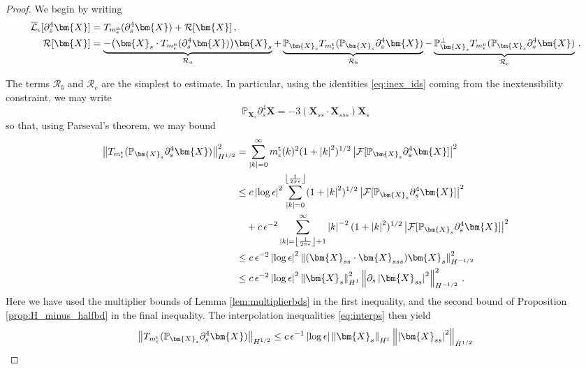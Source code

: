 \documentclass[11pt,reqno]{amsart}
\renewcommand{\P}{\mathbb{P}}
\newcommand{\X}{\bm{X}}
\newcommand{\p}{\partial}
\newcommand{\abs}[1]{\left\lvert #1 \right\rvert}
\newcommand{\norm}[1]{\left\lVert #1 \right\rVert}
\newcommand{\floor}[1]{\left\lfloor #1 \right\rfloor}
\newcommand{\mc}[1]{\mathcal{#1}}
\numberwithin{equation}{section}
\theoremstyle{definition}
\begin{document}
\begin{proof}
We begin by writing
\begin{equation}
\begin{aligned}
  \overline{\mc{L}}_\epsilon[\p_s^4\X] &= T_{m_\epsilon^{\rm n}}(\p_s^4\X) + \mc{R}[\X]\,,\\
  \mc{R}[\X] &= \underbrace{-\big(\X_s\cdot T_{m_\epsilon^{\rm n}}(\p_s^4\X)\big)\X_s}_{\mc{R}_a} + \underbrace{\P_{\X_s}T_{m_\epsilon^{\rm t}}(\P_{\X_s}\p_s^4\X)}_{\mc{R}_b} - \underbrace{\P_{\X_s}^\perp T_{m_\epsilon^{\rm n}}(\P_{\X_s}\p_s^4\X) }_{\mc{R}_c}\,.
\end{aligned}
\end{equation}

The terms $\mc{R}_b$ and $\mc{R}_c$ are the simplest to estimate. In particular, using the identities \eqref{eq:inex_ids} coming from the inextensibility constraint, we may write
\begin{equation}\label{eq:tang_ID}
  \P_{\X_s}\p_s^4\X = -3(\X_{ss}\cdot\X_{sss})\X_s 
\end{equation}
so that, using Parseval's theorem, we may bound
\begin{equation}
\begin{aligned}
  \norm{T_{m_\epsilon^{\rm t}}(\P_{\X_s}\p_s^4\X)}_{H^{1/2}}^2
  &= \sum_{\abs{k}=0}^\infty m_\epsilon^{\rm t}(k)^2(1+\abs{k}^2)^{1/2}\abs{\mc{F}[\P_{\X_s}\p_s^4\X]}^2 \\
  &\le c\abs{\log\epsilon}^2\sum_{\abs{k}=0}^{\floor{\frac{1}{2\pi\epsilon}}}(1+\abs{k}^2)^{1/2}\abs{\mc{F}[\P_{\X_s}\p_s^4\X]}^2\\
  &\quad + c\,\epsilon^{-2}\sum_{\abs{k}=\floor{\frac{1}{2\pi\epsilon}}+1}^\infty \abs{k}^{-2}(1+\abs{k}^2)^{1/2}\abs{\mc{F}[\P_{\X_s}\p_s^4\X]}^2\\
  &\le c\,\epsilon^{-2}\abs{\log\epsilon}^2\norm{(\X_{ss}\cdot\X_{sss})\X_s}_{H^{-1/2}}^2\\
  &\le c\,\epsilon^{-2}\abs{\log\epsilon}^2\norm{\X_s}_{H^1}^2\norm{\p_s\abs{\X_{ss}}^2}_{H^{-1/2}}^2\,.
\end{aligned}
\end{equation}
Here we have used the multiplier bounds of Lemma \ref{lem:multiplierbds} in the first inequality, and the second bound of Proposition \ref{prop:H_minus_halfbd} in the final inequality. The interpolation inequalities \eqref{eq:interps} then yield 
\begin{equation}
\begin{aligned}
  \norm{T_{m_\epsilon^{\rm t}}(\P_{\X_s}\p_s^4\X)}_{H^{1/2}} &\le c\,\epsilon^{-1}\abs{\log\epsilon}\norm{\X_s}_{H^1}\norm{\abs{\X_{ss}}^2}_{\dot H^{1/2}}\\

\end{aligned}
\end{equation}
\end{proof}
\end{document}
